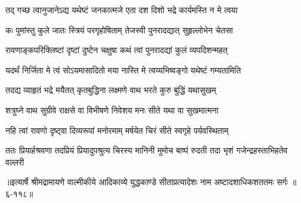 \twolineshloka
{तद् गच्छ त्वानुजानेऽद्य यथेष्टं जनकात्मजे}
{एता दश दिशो भद्रे कार्यमस्ति न मे त्वया} %

\twolineshloka
{कः पुमांस्तु कुले जातः स्त्रियं परगृहोषिताम्}
{तेजस्वी पुनरादद्यात् सुहृल्लोभेन चेतसा} %

\twolineshloka
{रावणाङ्कपरिक्लिष्टां दृष्टां दुष्टेन चक्षुषा}
{कथं त्वां पुनरादद्यां कुलं व्यपदिशन्महत्} %

\twolineshloka
{यदर्थं निर्जिता मे त्वं सोऽयमासादितो मया}
{नास्ति मे त्वय्यभिष्वङ्गो यथेष्टं गम्यतामिति} %

\twolineshloka
{तदद्य व्याहृतं भद्रे मयैतत् कृतबुद्धिना}
{लक्ष्मणे वाथ भरते कुरु बुद्धिं यथासुखम्} %

\twolineshloka
{शत्रुघ्ने वाथ सुग्रीवे राक्षसे वा विभीषणे}
{निवेशय मनः सीते यथा वा सुखमात्मना} %

\twolineshloka
{नहि त्वां रावणो दृष्ट्वा दिव्यरूपां मनोरमाम्}
{मर्षयेत चिरं सीते स्वगृहे पर्यवस्थिताम्} %

\twolineshloka
{ततः प्रियार्हश्रवणा तदप्रियं प्रियादुपश्रुत्य चिरस्य मानिनी}
{मुमोच बाष्पं रुदती तदा भृशं गजेन्द्रहस्ताभिहतेव वल्लरी} %


॥इत्यार्षे श्रीमद्रामायणे वाल्मीकीये आदिकाव्ये युद्धकाण्डे सीताप्रत्यादेशः नाम अष्टादशाधिकशततमः सर्गः ॥६-११८॥
